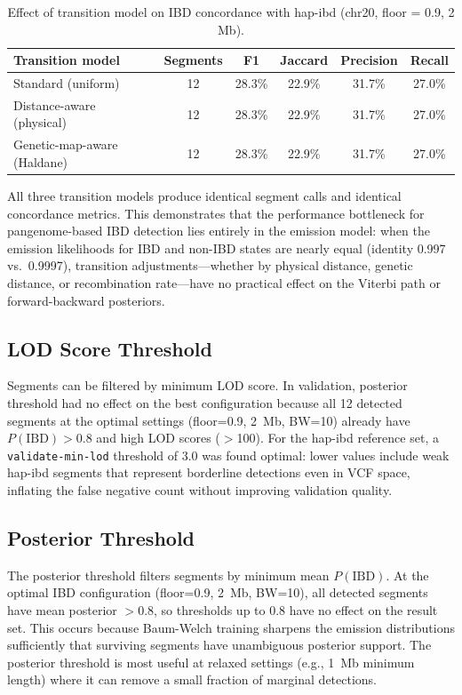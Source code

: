 \documentclass[11pt]{article}
\begin{document}
\begin{table}[ht]
\centering
\caption{Effect of transition model on IBD concordance with hap-ibd (chr20, floor = 0.9, 2 Mb).}
\label{tab:distance_aware}
\begin{tabular}{lccccc}
\hline
\textbf{Transition model} & \textbf{Segments} & \textbf{F1} & \textbf{Jaccard} & \textbf{Precision} & \textbf{Recall} \\
\hline
Standard (uniform) & 12 & 28.3\% & 22.9\% & 31.7\% & 27.0\% \\
Distance-aware (physical) & 12 & 28.3\% & 22.9\% & 31.7\% & 27.0\% \\
Genetic-map-aware (Haldane) & 12 & 28.3\% & 22.9\% & 31.7\% & 27.0\% \\
\hline
\end{tabular}
\end{table}

All three transition models produce identical segment calls and identical concordance metrics. This demonstrates that the performance bottleneck for pangenome-based IBD detection lies entirely in the emission model: when the emission likelihoods for IBD and non-IBD states are nearly equal (identity 0.997 vs.\ 0.9997), transition adjustments---whether by physical distance, genetic distance, or recombination rate---have no practical effect on the Viterbi path or forward-backward posteriors.

\subsection{LOD Score Threshold}

Segments can be filtered by minimum LOD score. In validation, posterior threshold had no effect on the best configuration because all 12 detected segments at the optimal settings (floor=0.9, 2~Mb, BW=10) already have $P(\text{IBD}) > 0.8$ and high LOD scores ($>$100). For the hap-ibd reference set, a \texttt{validate-min-lod} threshold of 3.0 was found optimal: lower values include weak hap-ibd segments that represent borderline detections even in VCF space, inflating the false negative count without improving validation quality.

\subsection{Posterior Threshold}

The posterior threshold filters segments by minimum mean $P(\text{IBD})$. At the optimal IBD configuration (floor=0.9, 2~Mb, BW=10), all detected segments have mean posterior $> 0.8$, so thresholds up to 0.8 have no effect on the result set. This occurs because Baum-Welch training sharpens the emission distributions sufficiently that surviving segments have unambiguous posterior support. The posterior threshold is most useful at relaxed settings (e.g., 1~Mb minimum length) where it can remove a small fraction of marginal detections.
\end{document}
